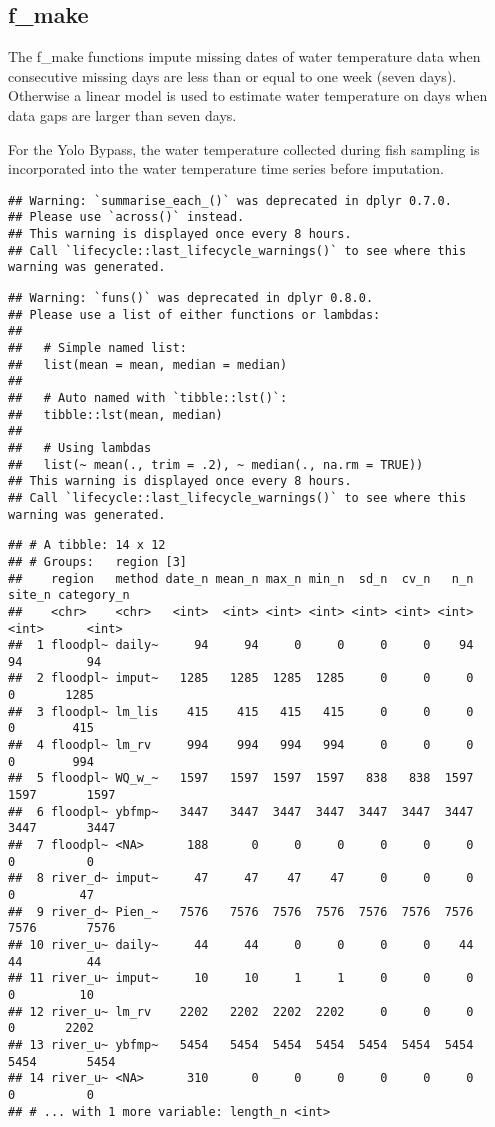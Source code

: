 \documentclass[
]{article}
\begin{document}
\hypertarget{f_make}{%
\subsection{f\_make}\label{f_make}}

The f\_make functions impute missing dates of water temperature data
when consecutive missing days are less than or equal to one week (seven
days). Otherwise a linear model is used to estimate water temperature on
days when data gaps are larger than seven days.

For the Yolo Bypass, the water temperature collected during fish
sampling is incorporated into the water temperature time series before
imputation.

\begin{verbatim}
## Warning: `summarise_each_()` was deprecated in dplyr 0.7.0.
## Please use `across()` instead.
## This warning is displayed once every 8 hours.
## Call `lifecycle::last_lifecycle_warnings()` to see where this warning was generated.
\end{verbatim}

\begin{verbatim}
## Warning: `funs()` was deprecated in dplyr 0.8.0.
## Please use a list of either functions or lambdas: 
## 
##   # Simple named list: 
##   list(mean = mean, median = median)
## 
##   # Auto named with `tibble::lst()`: 
##   tibble::lst(mean, median)
## 
##   # Using lambdas
##   list(~ mean(., trim = .2), ~ median(., na.rm = TRUE))
## This warning is displayed once every 8 hours.
## Call `lifecycle::last_lifecycle_warnings()` to see where this warning was generated.
\end{verbatim}

\begin{verbatim}
## # A tibble: 14 x 12
## # Groups:   region [3]
##    region   method date_n mean_n max_n min_n  sd_n  cv_n   n_n site_n category_n
##    <chr>    <chr>   <int>  <int> <int> <int> <int> <int> <int>  <int>      <int>
##  1 floodpl~ daily~     94     94     0     0     0     0    94     94         94
##  2 floodpl~ imput~   1285   1285  1285  1285     0     0     0      0       1285
##  3 floodpl~ lm_lis    415    415   415   415     0     0     0      0        415
##  4 floodpl~ lm_rv     994    994   994   994     0     0     0      0        994
##  5 floodpl~ WQ_w_~   1597   1597  1597  1597   838   838  1597   1597       1597
##  6 floodpl~ ybfmp~   3447   3447  3447  3447  3447  3447  3447   3447       3447
##  7 floodpl~ <NA>      188      0     0     0     0     0     0      0          0
##  8 river_d~ imput~     47     47    47    47     0     0     0      0         47
##  9 river_d~ Pien_~   7576   7576  7576  7576  7576  7576  7576   7576       7576
## 10 river_u~ daily~     44     44     0     0     0     0    44     44         44
## 11 river_u~ imput~     10     10     1     1     0     0     0      0         10
## 12 river_u~ lm_rv    2202   2202  2202  2202     0     0     0      0       2202
## 13 river_u~ ybfmp~   5454   5454  5454  5454  5454  5454  5454   5454       5454
## 14 river_u~ <NA>      310      0     0     0     0     0     0      0          0
## # ... with 1 more variable: length_n <int>
\end{verbatim}
\end{document}
